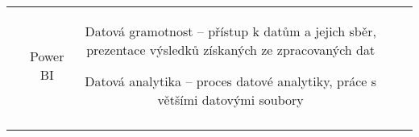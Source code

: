 \begin{landscape}
\begin{table}[htbp]
{\begin{tabularx}{\linewidth}{CCCCC}
&

Power BI

&

Datová gramotnost – přístup k datům a jejich sběr, prezentace výsledků získaných ze zpracovaných dat

Datová analytika – proces datové analytiky, práce s většími datovými soubory

\\

\tabularnewline
\bottomrule
\end{tabularx}

}

\end{table}

\end{landscape}